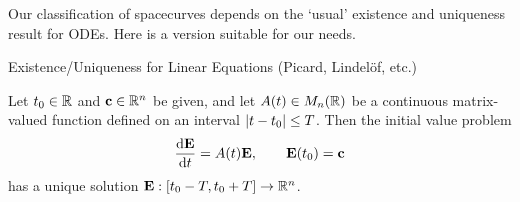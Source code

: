 Our classification of spacecurves depends on the `usual' existence and uniqueness result for ODEs. %
Here is a version suitable for our needs.
% 
% 
% 
% 
% 

\begin{thm}{Existence/Uniqueness for Linear Equations (Picard, Lindelöf, etc.)}{}\phantom{bob}\par
Let $t_0\in\R$ and $\vc\in\R^n$ be given, and let $A(t)\in M_n(\R)$ be a continuous matrix-valued function defined on an interval $\nm{t-t_0}\le T$. Then the initial value problem
\[
	\diff[\vE]{t}=A(t)\vE,\qquad \vE(t_0)=\vc
\]
has a unique solution $\vE:[t_0-T,t_0+T]\to \R^n$.
\end{thm}

